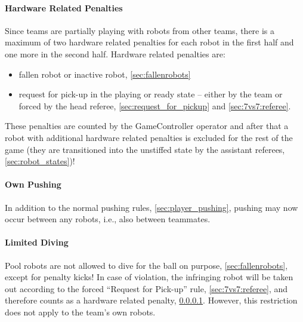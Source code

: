         \paragraph{Hardware Related Penalties}
            \label{sec:7vs7:hardware_related_penalties}
            Since teams are partially playing with robots from other teams, there is a maximum of two hardware related penalties for each robot in the first half and one more in the second half.
            Hardware related penalties are:
            \begin{itemize}
                \item fallen robot or inactive robot, \cf \cref{sec:fallenrobots}
                \item request for pick-up in the playing or ready state -- either by the team or forced by the head referee, \cf \cref{sec:request_for_pickup} and \cref{sec:7vs7:referee}.
            \end{itemize}
            These penalties are counted by the GameController operator and after that a robot with additional hardware related penalties is excluded for the rest of the game (they are transitioned into the unstiffed state by the assistant referees, \cf \cref{sec:robot_states})!

        \paragraph{Own Pushing}
            In addition to the normal pushing rules, \cf \cref{sec:player_pushing}, pushing may now occur between any robots, i.e., also between teammates.

        \paragraph{Limited Diving}
            Pool robots are not allowed to dive for the ball on purpose, \cf \cref{sec:fallenrobots}, except for penalty kicks! In case of violation, the infringing robot will be taken out according to the forced ``Request for Pick-up'' rule, \cf \cref{sec:7vs7:referee}, and therefore counts as a hardware related penalty, \cf \cref{sec:7vs7:hardware_related_penalties}. However, this restriction does not apply to the team's own robots.

